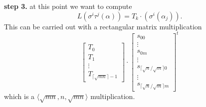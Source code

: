 \textbf{step 3.} at this point we want to compute 
$$L(\sigma^i\tau^j(\alpha)) = T_k\cdot(\sigma^i(\alpha_j)).$$
This can be carried out with a rectangular matrix multiplication
$$
\left[ \begin{array}{c}
T_0\\
\hline
T_1\\
\hline
\vdots\\
\hline
T_{\lceil \sqrt{mn} \rceil-1}
\end{array} 
\right]
\cdot
\left[\begin{array}{l}
s_{00} \\
\hline
 \vdots \\
 \hline
s_{0m} \\
 \hline
\vdots \\
\hline
s_{\lceil \sqrt{n}/\sqrt{m} \rceil 0} \\
\hline
\vdots \\
\hline
s_{\lceil \sqrt{n}/\sqrt{m} \rceil m}
\end{array}
\right]^t
$$
which is a $\langle \sqrt{mn},n,\sqrt{mn}\rangle$ multiplication.  
 
